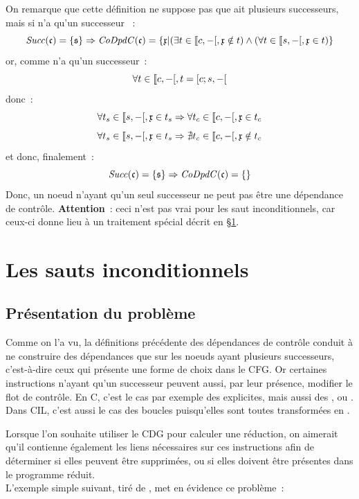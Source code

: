 On remarque que cette définition ne suppose pas que  ait plusieurs
successeurs, mais si  n'a qu'un successeur ~:
$$
\mathit{Succ}(\mathfrak{c}) = \{ \mathfrak{s} \} \Rightarrow
\mathit{CoDpdC}(\mathfrak{c}) = \{\mathfrak{x} | (\exists t \in \llbracket c, -[, \mathfrak{x} \notin t)
\wedge (\forall t \in \llbracket s, -[, \mathfrak{x} \in t) \}
$$
or, comme  n'a qu'un successeur~:
$$
\forall t \in \llbracket c, -[, t = [c; s, -[
$$
donc~:
$$
\forall t_s \in \llbracket s, -[, \mathfrak{x} \in t_s
\Rightarrow \forall t_c \in \llbracket c, -[, \mathfrak{x} \in t_c
$$
$$
\forall t_s \in \llbracket s, -[, \mathfrak{x} \in t_s
\Rightarrow \nexists t_c \in \llbracket c, -[, \mathfrak{x} \notin t_c
$$
et donc, finalement~:
$$
\mathit{Succ}(\mathfrak{c}) = \{ \mathfrak{s} \} \Rightarrow \mathit{CoDpdC}(\mathfrak{c}) = \{\}
$$
Donc, un noeud n'ayant qu'un seul successeur ne peut pas être une dépendance de
contrôle. {\bf Attention}~: ceci n'est pas vrai pour les saut inconditionnels,
car ceux-ci donne lieu à un traitement spécial décrit en \S\ref{sec-goto}.


\section{Les sauts inconditionnels}\label{sec-goto}

\subsection{Présentation du problème}

Comme on l'a vu,
la définitions précédente des dépendances de contrôle conduit à
ne construire des dépendances que sur les noeuds ayant plusieurs successeurs,
c'est-à-dire ceux qui présente une forme de choix dans le CFG.
Or certaines instructions n'ayant qu'un successeur
peuvent aussi, par leur présence, modifier le flot de contrôle.
En C, c'est le cas par exemple des  explicites,
mais aussi des  ,  ou .
Dans CIL, c'est aussi le cas des boucles puisqu'elles sont toutes transformées
en .

Lorsque l'on souhaite utiliser le CDG pour calculer une réduction,
on aimerait
qu'il contienne également les liens nécessaires sur ces instructions
afin de déterminer si elles peuvent être supprimées,
ou si elles doivent être présentes dans le programme réduit.\\

L'exemple simple suivant, tiré de \cite{Choi94}, met en évidence ce problème~:


